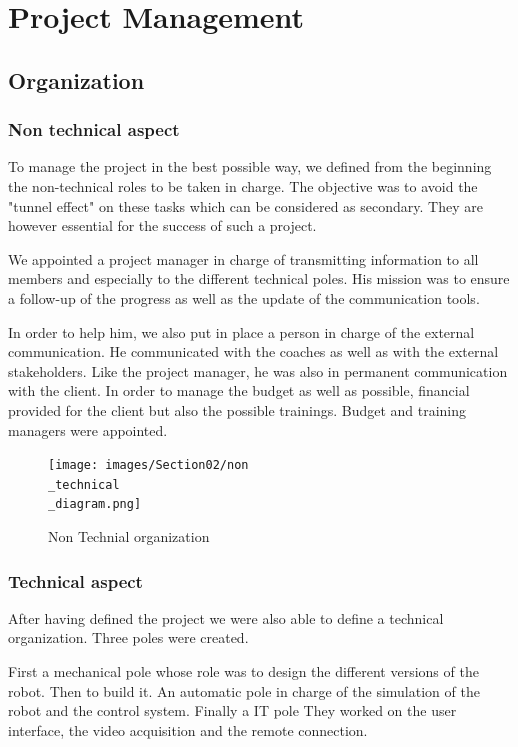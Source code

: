 \section{Project Management}\insertloftspace
\setcounter{figure}{0}\setcounter{table}{0}

\subsection{Organization}
\subsubsection{Non technical aspect}

To manage the project in the best possible way, we defined from the beginning the non-technical roles to be taken in charge. The objective was to avoid the "tunnel effect" on these tasks which can be considered as secondary. They are however essential for the success of such a project. 

\bigbreak
We appointed a project manager in charge of transmitting information to all members and especially to the different technical poles. His mission was to ensure a follow-up of the progress as well as the update of the communication tools. 

\bigbreak
In order to help him, we also put in place a person in charge of the external communication. He communicated with the coaches as well as with the external stakeholders. Like the project manager, he was also in permanent communication with the client. In order to manage the budget as well as possible, financial provided for the client but also the possible trainings. Budget and training managers were appointed. 

\begin{figure}[ht]
    \centering
    \texttt{[image: images/Section02/non\\\_technical\\\_diagram.png]}
    \caption{Non Technial organization}
    \label{fig:mesh2}
\end{figure}

\subsubsection{Technical aspect}

After having defined the project we were also able to define a technical organization. Three poles were created. 

\bigbreak
First a mechanical pole whose role was to design the different versions of the robot. Then to build it. An automatic pole in charge of the simulation of the robot and the control system. Finally a IT pole They worked on the user interface, the video acquisition and the remote connection.

